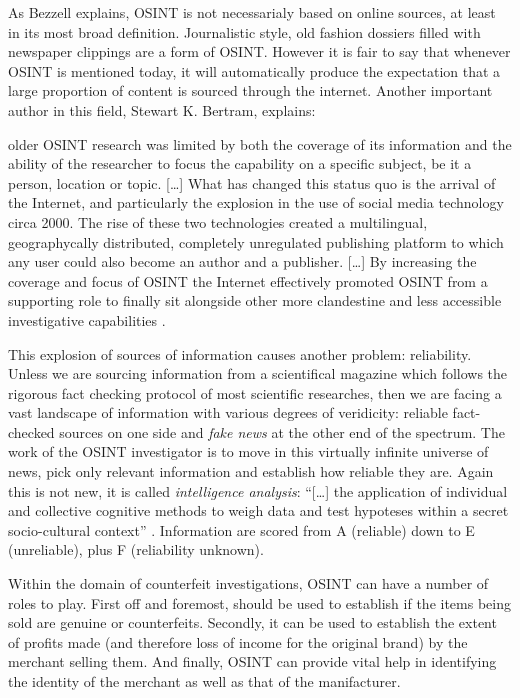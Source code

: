 As Bezzell explains, OSINT is not necessarialy based on online sources, at least
in its most broad definition. Journalistic style, old fashion dossiers filled
with newspaper clippings are a form of OSINT. However it is fair to say that
whenever OSINT is mentioned today, it will automatically produce the expectation
that a large proportion of content is sourced through the internet. Another
important author in this field, Stewart K. Bertram, explains:
\begin{displayquote}
older OSINT research was limited by both the coverage of its information and the
ability of the researcher to focus the capability on a specific subject, be it
a person, location or topic. [\ldots] What has changed this status quo is the
arrival of the Internet, and particularly the explosion in the use of social
media technology circa 2000. The rise of these two technologies created a
multilingual, geographycally distributed, completely unregulated publishing
platform to which any user could also become an author and a publisher. [\ldots]
By increasing the coverage and focus of OSINT the Internet effectively promoted
OSINT from a supporting role to finally sit alongside other more clandestine and
less accessible investigative capabilities \cite{SB15}.
\end{displayquote}

This explosion of sources of information causes another problem: reliability.
Unless we are sourcing information from a scientifical magazine which
follows the rigorous fact checking protocol of most scientific researches, then
we are facing a vast landscape of information with various degrees of
veridicity: reliable fact-checked sources on one side and \emph{fake news} at
the other end of the spectrum. The work of the OSINT investigator is to move in
this virtually infinite universe of news, pick only relevant information and
establish how reliable they are. Again this is not new, it is called
\emph{intelligence analysis}: ``[\ldots] the application of individual and
collective cognitive methods to weigh data and test hypoteses within a secret
socio-cultural context'' \cite{JH07}. Information
are scored from A (reliable) down to E (unreliable), plus F (reliability
unknown).

Within the domain of counterfeit investigations, OSINT can have a number of
roles to play. First off and foremost, should be used to establish if the items
being sold are genuine or counterfeits. Secondly, it can be used to establish
the extent of profits made (and therefore loss of income for the original brand)
by the merchant selling them. And finally, OSINT can provide vital help in
identifying the identity of the merchant as well as that of the manifacturer.



